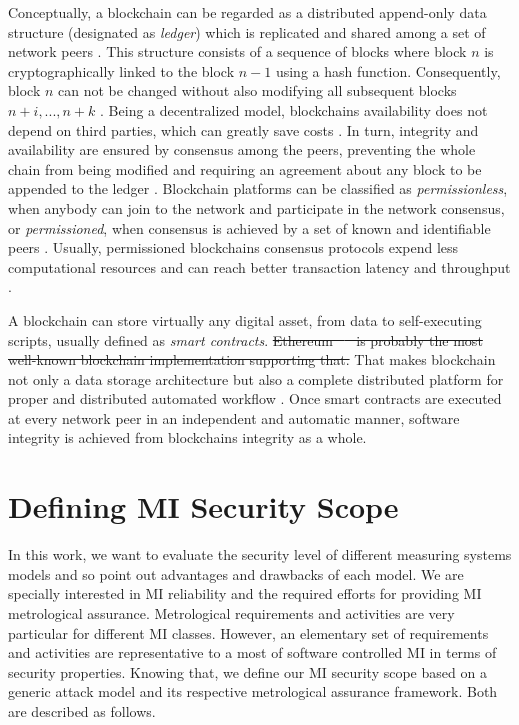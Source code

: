 \documentclass[journal]{IEEEtran} %
\providecommand{\DIFdel}[1]{{\protect\color{red}\sout{#1}}}                      %
\providecommand{\DIFdelbegin}{} %
\providecommand{\DIFdelend}{} %
\begin{document}
Conceptually, a blockchain can be regarded as a distributed append-only data structure (designated as \emph{ledger}) which is replicated and shared among a set of network peers \cite{Christidis2016}. 
This structure consists of a sequence of blocks where block $n$ is cryptographically linked to the block $n-1$ using a hash function.
Consequently, block $n$ can not be changed without also modifying all subsequent blocks $n + i, ..., n + k$ \cite{Sousa2017}. 
Being a decentralized model, blockchains availability does not depend on third parties, which can greatly save costs \cite{Zheng2017}.
In turn, integrity and availability are ensured by consensus among the peers, preventing the whole chain from being modified and requiring an agreement about any block to be appended to the ledger \cite{Sousa2017,Vukolic2016}.
Blockchain platforms can be classified as \emph{permissionless}, when anybody can join to the network and participate in the network consensus, or \emph{permissioned}, when consensus is achieved by a set of known and identifiable peers \cite{Vukolic2016,Vukolic2017a}. Usually, permissioned blockchains consensus protocols expend less computational resources and can reach better transaction latency and throughput \cite{Sousa2017}.

A blockchain can store virtually any digital asset, from data to self-executing scripts, usually defined as \emph{smart contracts}. \DIFdelbegin \DIFdel{Ethereum \mbox{%
\cite{Christidis2016} }%
is probably the most well-known blockchain implementation supporting that. }\DIFdelend %
That makes blockchain not only a data storage architecture but also a complete distributed platform for proper and distributed automated workflow \cite{Christidis2016}. 
Once smart contracts are executed at every network peer in an independent and automatic manner, software integrity is achieved from blockchains integrity as a whole. 

\section{Defining MI Security Scope}
In this work, we want to evaluate the security level of different measuring systems models and so point out advantages and drawbacks of each model. We are specially interested in MI reliability and the required efforts for providing MI metrological assurance. Metrological requirements and activities are very particular for different MI classes. However, an elementary set of requirements and activities are representative to a most of software controlled MI in terms of security properties. Knowing that, we define our MI security scope based on a generic attack model and its respective metrological assurance framework. Both are described as follows. %
\end{document}
